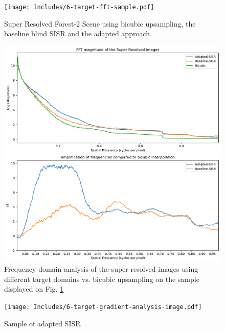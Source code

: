             \begin{figure}[h!]
                \centering
                \texttt{[image: Includes/6-target-fft-sample.pdf]}
                \caption{Super Resolved Forest-2 Scene using bicubic upsampling, the baseline blind SISR and the adapted approach.}
                \label{fig:6-target-fft-sample}
            \end{figure}


            \begin{figure}[h!]
                \centering
                \includegraphics[scale=0.5]{Includes/6-target-fft-analysis.pdf}
                \caption{Frequency domain analysis of the super resolved images using different target domains vs. bicubic upsampling on the sample displayed on Fig. \ref{fig:6-target-fft-sample}}
                \label{fig:6-target-fft-analysis}
            \end{figure}


            


            
    
            \begin{figure}[h!]
                \centering
                \texttt{[image: Includes/6-target-gradient-analysis-image.pdf]}
                \caption{Sample of adapted SISR}
                \label{fig:6-target-gradient-analysis-image}
            \end{figure}

